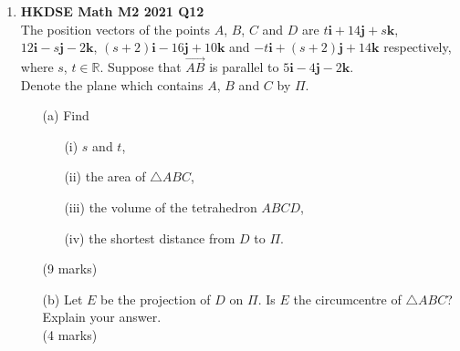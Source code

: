 \documentclass{report}
\begin{document}
\begin{enumerate}
	\item \textbf{HKDSE Math M2 2021 Q12}\\
	The position vectors of the points $A$, $B$, $C$ and $D$ are  $t\textbf{i} +14 \textbf{j}+s \textbf {k}$, $12\textbf{i} -s \textbf{j}-2 \textbf {k}$, $(s+2)\textbf{i} -16 \textbf{j}+10 \textbf {k}$ and $-t\textbf{i} +(s+2) \textbf{j}+14 \textbf {k}$  respectively, where $s$, $t \in \mathbb{R}$. Suppose that $\overrightarrow{AB}$ is parallel to $5\textbf{i} -4 \textbf{j}-2 \textbf {k}$. \\Denote the plane which contains $A$, $B$ and $C$ by $\Pi$.
	\begin{enumerate}
		\item [(a)]Find
		\begin{enumerate}
			\item [(i)]$s$ and $t$,
			\item [(ii)]the area of $\triangle ABC$,
			\item [(iii)]the volume of the tetrahedron $ABCD$,
			\item [(iv)]the shortest distance from $D$ to $\Pi$.
		\end{enumerate}
		(9 marks)
		\item [(b)]Let $E$ be the projection of  $D$ on $\Pi$. Is $E$ the circumcentre of $\triangle ABC$? Explain your answer.\\(4 marks)
	\end{enumerate}
	
	\newpage


\end{enumerate}
\end{document}

